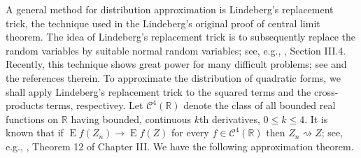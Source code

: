 \documentclass[smallextended]{svjour3}       %
\DeclareMathOperator{\myE}{E}
\begin{document}
A general method for distribution approximation is Lindeberg's replacement trick, the technique used in the Lindeberg's original proof of central limit theorem.
The idea of Lindeberg's replacement trick is to subsequently replace the random variables by suitable normal random variables; see, e.g., \cite{pollard1984convergence}, Section III.4.
Recently, this technique shows great power for many difficult problems; see \cite{Chatterjee2006} and the references therein.
To approximate the distribution of quadratic forms, we shall apply Lindeberg's replacement trick to the squared terms and the cross-products terms, respectivey.
Let $\mathscr C^4(\mathbb R)$ denote the class of all bounded real functions on $\mathbb R$ having bounded, continuous $k$th derivatives, $0\leq k\leq 4$.
It is known that if $\myE f(Z_n)\to \myE f(Z)$ for every $f\in \mathscr C^4 (\mathbb R)$ then $Z_n \rightsquigarrow Z$; see, e.g., \cite{pollard1984convergence}, Theorem 12 of Chapter III.
We have the following approximation theorem.
\end{document}
